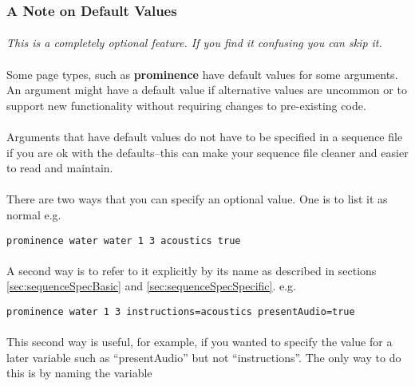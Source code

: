 \subsubsection{A Note on Default Values}

\paragraph{}
\textit{This is a completely optional feature.  If you find it confusing you can skip it.}

\paragraph{}
Some page types, such as \textbf{prominence} have default values for some arguments.   An argument might have a default value if alternative values are uncommon or to support new functionality without requiring changes to pre-existing code.

\paragraph{}
Arguments that have default values do not have to be specified in a sequence file if you are ok with the defaults--this can make your sequence file cleaner and easier to read and maintain.

\paragraph{}
There are two ways that you can specify an optional value.  One is to list it as normal e.g.

\begin{lstlisting}
prominence water water 1 3 acoustics true
\end{lstlisting}

\paragraph{}
A second way is to refer to it explicitly by its name as described in sections \ref{sec:sequenceSpecBasic} and \ref{sec:sequenceSpecSpecific}. e.g.

\begin{lstlisting}
prominence water 1 3 instructions=acoustics presentAudio=true
\end{lstlisting}

\paragraph{}
This second way is useful, for example, if you wanted to specify the value for a later variable such as ``presentAudio'' but not ``instructions''.  The only way to do this is by naming the variable 

